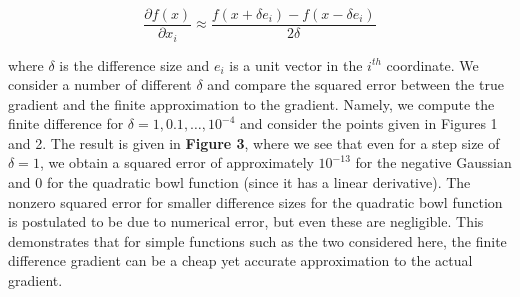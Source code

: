 \documentclass[psamsfonts]{amsart}
\theoremstyle{definition}
\theoremstyle{remark}
\numberwithin{equation}{section}
\begin{document}
$$\frac{\partial f(x)}{\partial x_i} \approx \frac{f(x + \delta e_i) - f(x - \delta e_i)}{2\delta}$$

where $\delta$ is the difference size and $e_i$ is a unit vector in the $i^{th}$ coordinate. We consider a number of different $\delta$ and compare the squared error between the true gradient and the finite approximation to the gradient. Namely, we compute the finite difference for $\delta = 1, 0.1, \dots, 10^{-4}$ and consider the points given in Figures 1 and 2. The result is given in {\bf Figure 3}, where we see that even for a step size of $\delta = 1$, we obtain a squared error of approximately $10^{-13}$ for the negative Gaussian and 0 for the quadratic bowl function (since it has a linear derivative). The nonzero squared error for smaller difference sizes for the quadratic bowl function is postulated to be due to numerical error, but even these are negligible. This demonstrates that for simple functions such as the two considered here, the finite difference gradient can be a cheap yet accurate approximation to the actual gradient.
\end{document}
